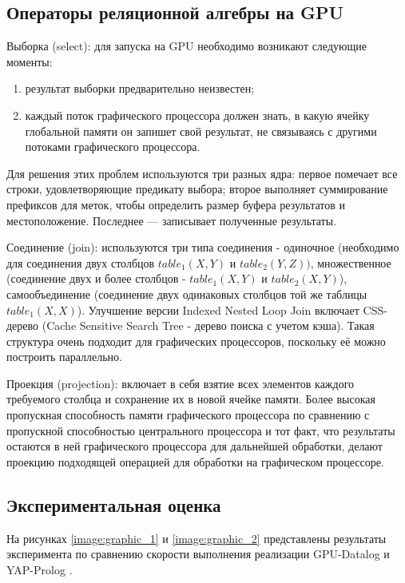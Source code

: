 \subsection{Операторы реляционной алгебры на GPU}
Выборка (select): для запуска на GPU необходимо возникают следующие моменты:

\begin{enumerate}
	\item результат выборки предварительно неизвестен;
	\item каждый поток графического процессора должен знать, в какую ячейку глобальной памяти он запишет свой результат, не связываясь с другими потоками графического процессора.
\end{enumerate}

Для решения этих проблем используются три разных ядра: первое помечает все строки, удовлетворяющие предикату выбора; второе выполняет суммирование префиксов для меток, чтобы определить размер буфера результатов и местоположение. Последнее --- записывает полученные результаты.

Соединение (join): используются три типа соединения - одиночное (необходимо для соединения двух столбцов $table_1(X, Y)$ и $table_2(Y, Z))$, множественное (соединение двух и более столбцов - $table_1(X,Y)$ и $table_2(X,Y)$), самообъединение (соединение двух одинаковых столбцов той же таблицы $table_1(X,X)$). Улучшение версии Indexed Nested Loop Join включает CSS-дерево (Cache Sensitive Search Tree - дерево поиска с учетом кэша). Такая структура очень подходит для графических процессоров, поскольку её можно построить параллельно.

Проекция (projection): включает в себя взятие всех элементов каждого требуемого столбца и сохранение их в новой ячейке памяти. Более высокая пропускная способность памяти графического процессора по сравнению с пропускной способностью центрального процессора и тот факт, что результаты остаются в ней графического процессора для дальнейшей обработки, делают проекцию подходящей операцией для обработки на графическом процессоре.

\subsection{Экспериментальная оценка}
На рисунках \ref{image:graphic_1} и \ref{image:graphic_2} представлены результаты эксперимента по сравнению скорости выполнения реализации GPU-Datalog и YAP-Prolog \cite{datalog}.

